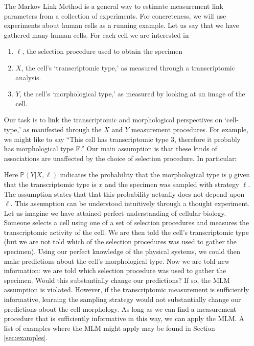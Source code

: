 The Markov Link Method is a general way to estimate measurement link parameters from a collection of experiments.  For concreteness, we will use experiments about human cells as a running example.  Let us say that we have gathered many human cells.  For each cell we are interested in 
%
\begin{enumerate}
    \item $\ell$, the selection procedure used to obtain the specimen
    \item $X$, the cell's `transcriptomic type,' as measured through a transcriptomic analysis.  
    \item $Y$, the cell's `morphological type,' as measured by looking at an image of the cell.
\end{enumerate}
%
Our task is to link the transcriptomic and morphological perspectives on `cell-type,' as manifested through the $X$ and $Y$ measurement procedures.  For example, we might like to say ``This cell has transcriptomic type 3, therefore it probably has morphological type F.''  Our main assumption is that these kinds of associations are unaffected by the choice of selection procedure.  In particular:

\begin{center}
\end{center}

Here $\mathbb{P}(Y|X,\ell)$ indicates the probability that the morphological type is $y$ given that the transcriptomic type is $x$ and the specimen was sampled with strategy $\ell$.  The assumption states that that this probability actually does not depend upon $\ell$.  This assumption can be understood intuitively through a thought experiment.  Let us imagine we have attained perfect understanding of cellular biology.  Someone selects a cell using one of a set of selection procedures and measures the transcriptomic activity of the cell.  We are then told the cell's transcriptomic type (but we are not told which of the selection procedures was used to gather the specimen).  Using our perfect knowledge of the physical systems, we could then make predictions about the cell's morphological type.  Now we are told new information: we are told which selection procedure was used to gather the specimen.  Would this substantially change our predictions?  If so, the MLM assumption is violated.  However, if the transcriptomic measurement is sufficiently informative, learning the sampling strategy would not substantially change our predictions about the cell morphology.  As long as we can find a measurement procedure that is sufficiently informative in this way, we can apply the MLM.  A list of examples where the MLM might apply may be found in Section \ref{sec:examples}.


